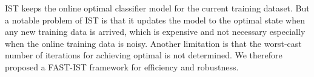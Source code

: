 \documentclass[letterpaper]{article}
\begin{document}
IST keeps the online optimal classifier model for the current training dataset. 
But a notable problem of IST is that it updates the model to the optimal state when any new training data is arrived, which is expensive and not necessary especially when the online training data is noisy. Another limitation is that the worst-cast number of iterations for achieving optimal is not determined.
We therefore proposed a FAST-IST framework for efficiency and robustness.

\begin{figure}[t]
\centering
{}\hspace{0.1cm}
\end{figure}
\end{document}
